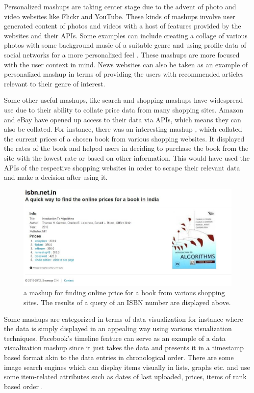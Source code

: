 Personalized mashups are taking center stage due to the advent of photo and video websites like Flickr and YouTube. These kinds of mashups involve user generated content of photos and videos with a host of features provided by the websites and their APIs. Some examples can include creating a collage of various photos with some background music of a suitable genre and using profile data of social networks for a more personalized feel \cite{4}. These mashups are more focused with the user context in mind. News websites can also be taken as an example of personalized mashup in terms of providing the users with recommended articles relevant to their genre of interest.

Some other useful mashups, like search and shopping mashups have widespread use due to their ability to collate price data from many shopping sites. Amazon and eBay have opened up access to their data via APIs, which means they can also be collated. For instance, there was an interesting mashup \cite{10}, which collated the current prices of a chosen book from various shopping websites. It displayed the rates of the book and helped users in deciding to purchase the book from the site with the lowest rate or based on other information. This would have used the APIs of the respective shopping websites in order to scrape their relevant data and make a decision after using it.

\begin{figure}[!h]
  \centering
  \includegraphics[width=16cm]{fig/book_price.jpg}
  \caption[Example of price comparasison mashup]
  { a mashup for finding online price for a book from various shopping sites. The results of a query of an ISBN number are displayed above.}
\end{figure}
\clearpage

Some mashups are categorized in terms of data visualization for instance where the data is simply displayed in an appealing way using various visualization techniques. Facebook’s timeline feature can  serve as an example of a data visualization mashup since it just takes the data and presents it in a timestamp based format akin to the data entries in chronological order. There are some image search engines which can display items visually in lists, graphs etc. and use some item-related attributes such as dates of last uploaded, prices, items of rank based order \cite{1}.

